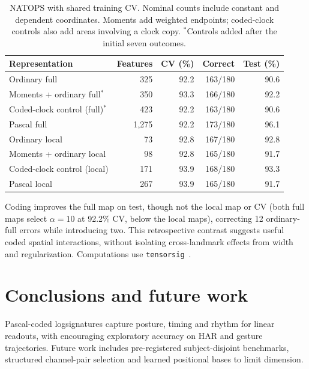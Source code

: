 \documentclass[a4paper]{esannV2}
\begin{document}
\begin{table}[!ht]
\centering
\begin{tabular}{@{}lrrrr@{}}
\toprule
Representation&Features&CV (\%)&Correct&Test (\%)\\
\midrule
Ordinary full&325&92.2&163/180&90.6\\
Moments + ordinary full$^*$&350&93.3&166/180&92.2\\
Coded-clock control (full)$^*$&423&92.2&163/180&90.6\\
Pascal full&1,275&92.2&173/180&96.1\\
\midrule
Ordinary local&73&92.8&167/180&92.8\\
Moments + ordinary local&98&92.8&165/180&91.7\\
Coded-clock control (local)&171&93.9&168/180&93.3\\
Pascal local&267&93.9&165/180&91.7\\
\bottomrule
\end{tabular}
\caption{NATOPS with shared training CV. Nominal counts include constant and
dependent coordinates. Moments add weighted endpoints; coded-clock controls
also add areas involving a clock copy. $^*$Controls added after the initial
seven outcomes.}
\label{tab:natops}
\end{table}

Coding improves the full map on test, though not the local map or CV (both
full maps select $\alpha=10$ at 92.2\% CV, below the local maps), correcting
12 ordinary-full errors while introducing two. This retrospective contrast
suggests useful coded spatial interactions, without isolating cross-landmark
effects from width and regularization. Computations use
\texttt{tensorsig}~\cite{tensorsig}.

\section{Conclusions and future work}
Pascal-coded logsignatures capture posture, timing and rhythm for linear readouts, with encouraging
exploratory accuracy on HAR and gesture trajectories. Future work includes
pre-registered subject-disjoint benchmarks, structured channel-pair
selection and learned positional bases to limit dimension.




\begin{footnotesize}

\end{footnotesize}
\end{document}
